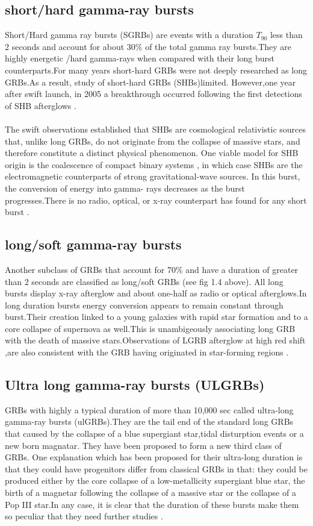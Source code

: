 \subsection{short/hard gamma-ray bursts} 
Short/Hard gamma ray bursts (SGRBs) are events with a duration $T_{90}$ less than 2 seconds and account for about 30\% of the total gamma ray bursts.They are highly energetic /hard gamma-rays when compared with their long burst counterparts.For many years short-hard GRBs were not deeply researched as long GRBs.As a result, study of short-hard GRBs (SHBs)limited. However,one year after swift launch, in 2005 a breakthrough occurred following the first detections of SHB afterglows \citep{5}\citep{6}.\\\\
The swift observations established that SHBs are cosmological relativistic sources that, unlike long GRBs, do not originate from the collapse of massive stars, and therefore constitute a distinct physical phenomenon. One viable model for SHB origin is the coalescence of compact binary systems , in which case SHBs are the electromagnetic counterparts of strong gravitational-wave sources. In this burst,
the conversion of energy into gamma- rays decreases as the burst progresses.There is no radio, optical, or x-ray counterpart has found for any short burst \citep{5}.
\subsection{long/soft gamma-ray bursts} 
Another subclass of GRBs that account for 70\% and have a duration of greater than 2 seconds are classified as long/soft GRBs (see fig 1.4 above). All long bursts display x-ray afterglow and about one-half as radio or optical afterglows.In long duration bursts energy conversion appears to remain constant through burst.Their creation linked to a young galaxies with rapid star formation and to a core collapse of supernova as well.This is unambigeously associating long GRB with the death of massive stars.Observations of LGRB afterglow at high red shift ,are also consistent with the GRB having originated in star-forming regions \citep{6}.
\subsection{Ultra long gamma-ray bursts (ULGRBs)}
GRBs with highly a typical duration of more than 10,000 sec called ultra-long gamma-ray bursts (ulGRBs).They are the tail end of the standard long GRBs that caused by the collapse of a blue supergiant star,tidal disturption events or a new born magnatar. They have been proposed to form a new third class of GRBs. One explanation which has been proposed for their ultra-long duration is that they could have progenitors differ from classical GRBs in that: they could be produced either by the core collapse of a low-metallicity supergiant blue star, the birth of a magnetar following the collapse of a massive star or the collapse of a Pop III star.In any case, it is clear that the duration of these bursts make them so peculiar that they need further studies \citep{10} \citep{11}.
